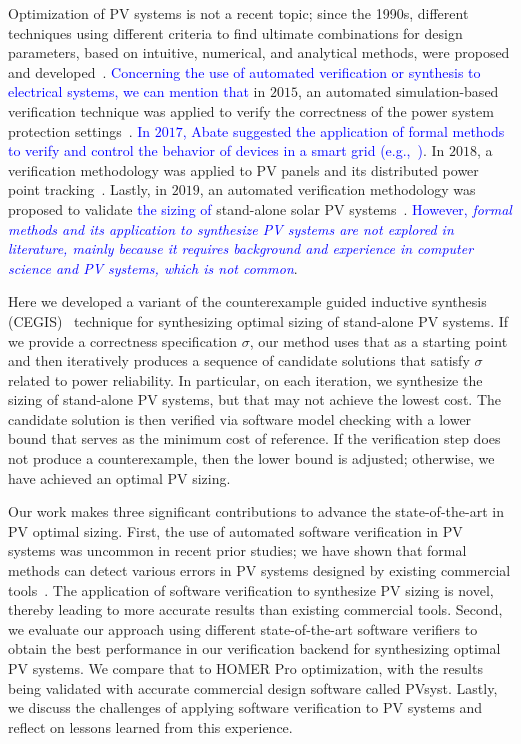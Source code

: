 \documentclass[runningheads]{llncs}
\begin{document}
Optimization of PV systems is not a recent topic; since the 1990s, different techniques using different criteria to find ultimate combinations for design parameters, based on intuitive, numerical, and analytical methods, were proposed and developed~\cite{Alsadi2018}. \textcolor{blue}{Concerning the use of automated verification or synthesis to electrical systems, we can mention that} in $2015$, an automated simulation-based verification technique was applied to verify the correctness of the power system protection settings~\cite{Sengupta2015}. \textcolor{blue}{In $2017$, Abate suggested the application of formal methods to verify and control the behavior of devices in a smart grid (e.g.,~\cite{Abate2017})}. In $2018$, a verification methodology was applied to PV panels and its distributed power point tracking~\cite{Driouich2018}. Lastly, in $2019$, an automated verification methodology was proposed to validate \textcolor{blue}{the sizing of} stand-alone solar PV systems~\cite{TrindadeCordeiro19}. \textcolor{blue}{However, \textit{formal methods and its application to synthesize PV systems are not explored in literature, mainly because it requires background and experience in computer science and PV systems, which is not common}}.

Here we developed a variant of the counterexample guided inductive synthesis (CEGIS)~\cite{AbateCAV2018} technique for synthesizing optimal sizing of stand-alone PV systems. If we provide a correctness specification $ \sigma $, our method uses that as a starting point and then iteratively produces a sequence of candidate solutions that satisfy $ \sigma $ related to power reliability. In particular, on each iteration, we synthesize the sizing of stand-alone PV systems, but that may not achieve the lowest cost. The candidate solution is then verified via software model checking with a lower bound that serves as the minimum cost of reference. If the verification step does not produce a counterexample, then the lower bound is adjusted; otherwise, we have achieved an optimal PV sizing. 

Our work makes three significant contributions to advance the state-of-the-art in PV optimal sizing. First, the use of automated software verification in PV systems was uncommon in recent prior studies; we have shown that formal methods can detect various errors in PV systems designed by existing commercial tools~\cite{TrindadeCordeiro19}. The application of software verification to synthesize PV sizing is novel, thereby leading to more accurate results than existing commercial tools. Second, we evaluate our approach using different state-of-the-art software verifiers to obtain the best performance in our verification backend for synthesizing optimal PV systems. We compare that to HOMER Pro optimization, with the results being validated with accurate commercial design software called PVsyst. Lastly, we discuss the challenges of applying software verification to PV systems and reflect on lessons learned from this experience.
\end{document}
